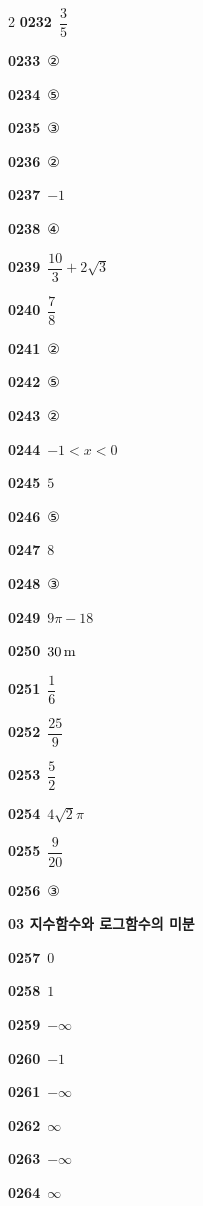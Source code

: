 \documentclass[10pt,a4paper]{article}
\begin{document}
\begin{multicols}{2}
\noindent\textbf{0232}\ $\dfrac{3}{5}$\par
\noindent\textbf{0233}\ ②\par
\noindent\textbf{0234}\ ⑤\par
\noindent\textbf{0235}\ ③\par
\noindent\textbf{0236}\ ②\par
\noindent\textbf{0237}\ $-1$\par
\noindent\textbf{0238}\ ④\par
\noindent\textbf{0239}\ $\dfrac{10}{3}+2\sqrt{3}$\par
\noindent\textbf{0240}\ $\dfrac{7}{8}$\par
\noindent\textbf{0241}\ ②\par
\noindent\textbf{0242}\ ⑤\par
\noindent\textbf{0243}\ ②\par
\noindent\textbf{0244}\ $-1<x<0$\par
\noindent\textbf{0245}\ $5$\par
\noindent\textbf{0246}\ ⑤\par
\noindent\textbf{0247}\ $8$\par
\noindent\textbf{0248}\ ③\par
\noindent\textbf{0249}\ $9\pi-18$\par
\noindent\textbf{0250}\ $30\mkern3mu \mathrm{m}$\par
\noindent\textbf{0251}\ $\dfrac{1}{6}$\par
\noindent\textbf{0252}\ $\dfrac{25}{9}$\par
\noindent\textbf{0253}\ $\dfrac{5}{2}$\par
\noindent\textbf{0254}\ $4\sqrt{2}\pi$\par
\noindent\textbf{0255}\ $\dfrac{9}{20}$\par
\noindent\textbf{0256}\ ③\par
\noindent\textbf{03 지수함수와 로그함수의 미분}\par\smallskip
\noindent\textbf{0257}\ $0$\par
\noindent\textbf{0258}\ $1$\par
\noindent\textbf{0259}\ $-\infty$\par
\noindent\textbf{0260}\ $-1$\par
\noindent\textbf{0261}\ $-\infty$\par
\noindent\textbf{0262}\ $\infty$\par
\noindent\textbf{0263}\ $-\infty$\par
\noindent\textbf{0264}\ $\infty$\par

\end{multicols}
\end{document}
